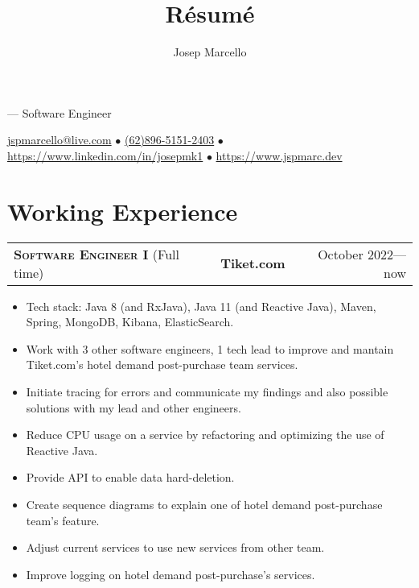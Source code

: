 \documentclass[10pt]{article}
\makeatletter
\renewcommand{\maketitle}{
    \rmfamily
    \noindent
    {\Huge \theauthor} ---
    \sffamily
    Software Engineer

    \vspace{0.1em}
    \noindent
    \href{mailto:jspmarcello@live.com}{jspmarcello@live.com} $\bullet$
    \href{https://wa.me/6289651512403}{(62)896-5151-2403} $\bullet$
    \href{https://www.linkedin.com/in/josepmk1}{https://www.linkedin.com/in/josepmk1} $\bullet$
    \href{https://www.jspmarc.dev}{https://www.jspmarc.dev}
}
\newcommand{\workExpVspace}{1em}
\newcommand{\workExp}[6]{
    \noindent \begin{tabularx}{\textwidth}{@{}X c|r}
        \textbf{\textsc{#5}} (#2) & \textbf{#1} & #3---#4
    \end{tabularx}

    {#6}
    \vspace{\workExpVspace}
}
\makeatother
\begin{document}
\title{R\'esum\'e}
\author{Josep Marcello}

\maketitle

\section{Working Experience}

\workExp
    {Tiket.com}
    {Full time}
    {October 2022}
    {now}
    {Software Engineer I}
    {
        \begin{itemize}
            \item Tech stack: Java 8 (and RxJava), Java 11 (and Reactive Java), Maven, Spring,
                MongoDB, Kibana, ElasticSearch.
            \item Work with 3 other software engineers, 1 tech lead to improve and mantain
                Tiket.com's hotel demand post-purchase team services.
            \item Initiate tracing for errors and communicate my findings and also possible
                solutions with my lead and other engineers.
            \item Reduce CPU usage on a service by refactoring and optimizing the use of Reactive
                Java.
            \item Provide API to enable data hard-deletion.
            \item Create sequence diagrams to explain one of hotel demand post-purchase team's
                feature.
            \item Adjust current services to use new services from other team.
            \item Improve logging on hotel demand post-purchase's services.
        \end{itemize}
    }
\end{document}

